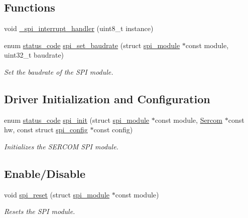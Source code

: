 \subsection*{Functions}
\begin{DoxyCompactItemize}
\item 
void \mbox{\hyperlink{group__asfdoc__sam0__sercom__spi__group_ga71091c8fcde0d526329e04f8c7b24efc}{\+\_\+spi\+\_\+interrupt\+\_\+handler}} (uint8\+\_\+t instance)
\item 
enum \mbox{\hyperlink{group__group__sam0__utils__status__codes_ga751c892e5a46b8e7d282085a5a5bf151}{status\+\_\+code}} \mbox{\hyperlink{group__asfdoc__sam0__sercom__spi__group_ga6bc86fe61f20b414ac3ca1a74c28dd28}{spi\+\_\+set\+\_\+baudrate}} (struct \mbox{\hyperlink{structspi__module}{spi\+\_\+module}} $\ast$const module, uint32\+\_\+t baudrate)
\begin{DoxyCompactList}\small\item\em Set the baudrate of the S\+PI module. \end{DoxyCompactList}\end{DoxyCompactItemize}
\subsection*{Driver Initialization and Configuration}
\begin{DoxyCompactItemize}
\item 
enum \mbox{\hyperlink{group__group__sam0__utils__status__codes_ga751c892e5a46b8e7d282085a5a5bf151}{status\+\_\+code}} \mbox{\hyperlink{group__asfdoc__sam0__sercom__spi__group_ga83b840fe8c91173bfe54a13787c262e6}{spi\+\_\+init}} (struct \mbox{\hyperlink{structspi__module}{spi\+\_\+module}} $\ast$const module, \mbox{\hyperlink{union_sercom}{Sercom}} $\ast$const hw, const struct \mbox{\hyperlink{structspi__config}{spi\+\_\+config}} $\ast$const config)
\begin{DoxyCompactList}\small\item\em Initializes the S\+E\+R\+C\+OM S\+PI module. \end{DoxyCompactList}\end{DoxyCompactItemize}
\subsection*{Enable/\+Disable}
\begin{DoxyCompactItemize}
\item 
void \mbox{\hyperlink{group__asfdoc__sam0__sercom__spi__group_ga65c764f92ed46f0d4845232bd4b241bc}{spi\+\_\+reset}} (struct \mbox{\hyperlink{structspi__module}{spi\+\_\+module}} $\ast$const module)
\begin{DoxyCompactList}\small\item\em Resets the S\+PI module. \end{DoxyCompactList}\end{DoxyCompactItemize}
